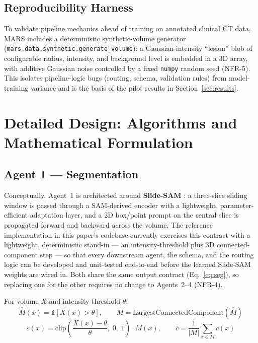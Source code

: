 \documentclass[11pt,a4paper]{article}
\begin{document}
\subsection{Reproducibility Harness}
To validate pipeline mechanics ahead of training on annotated clinical CT data, MARS includes a deterministic synthetic-volume generator (\texttt{mars.data.synthetic.generate\_volume}): a Gaussian-intensity ``lesion'' blob of configurable radius, intensity, and background level is embedded in a 3D array, with additive Gaussian noise controlled by a fixed \texttt{numpy} random seed (NFR-5). This isolates pipeline-logic bugs (routing, schema, validation rules) from model-training variance and is the basis of the pilot results in Section~\ref{sec:results}.

\section{Detailed Design: Algorithms and Mathematical Formulation}
\label{sec:design}

\subsection{Agent 1 --- Segmentation}
Conceptually, Agent~1 is architected around \textbf{Slide-SAM} \cite{slidesam}: a three-slice sliding window is passed through a SAM-derived encoder with a lightweight, parameter-efficient adaptation layer, and a 2D box/point prompt on the central slice is propagated forward and backward across the volume. The reference implementation in this paper's codebase currently exercises this contract with a lightweight, deterministic stand-in --- an intensity-threshold plus 3D connected-component step --- so that every downstream agent, the schema, and the routing logic can be developed and unit-tested end-to-end before the learned Slide-SAM weights are wired in. Both share the same output contract (Eq.~\ref{eq:seg}), so replacing one for the other requires no change to Agents~2--4 (NFR-4).

\begin{formulabox}
For volume $X$ and intensity threshold $\theta$:
\begin{equation}
\hat{M}(x) = \mathbb{1}[X(x) > \theta], \qquad
M = \text{LargestConnectedComponent}(\hat{M})
\label{eq:mask}
\end{equation}
\begin{equation}
c(x) = \text{clip}\!\left(\frac{X(x) - \theta}{\theta},\; 0,\; 1\right) \cdot M(x), \qquad
\bar{c} = \frac{1}{|M|}\sum_{x \in M} c(x)
\label{eq:conf}
\end{equation}
\end{formulabox}
\end{document}

